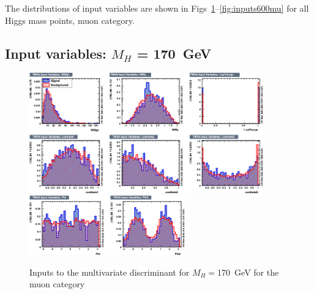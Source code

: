 The distributions of input variables are shown in Figs~\ref{fig:inputs170mu}--\ref{fig:inputs600mu}
for all Higgs mass points, muon category.
\newpage
\subsection{Input variables: \texorpdfstring{$M_H$}{M(H)} = 170~GeV}
\begin{figure}[ht]
  \centering
  \includegraphics[width=0.9\textwidth]{plots/2012_MVA/TMVA_170_nJ2_mu_variables_id_c1.png}
  \includegraphics[width=0.6\textwidth]{plots/2012_MVA/TMVA_170_nJ2_mu_variables_id_c2.png}	
  \caption{\label{fig:inputs170mu}Inputs to the multivariate discriminant for $M_H = $170~GeV for the muon category}
\end{figure}
\newpage
